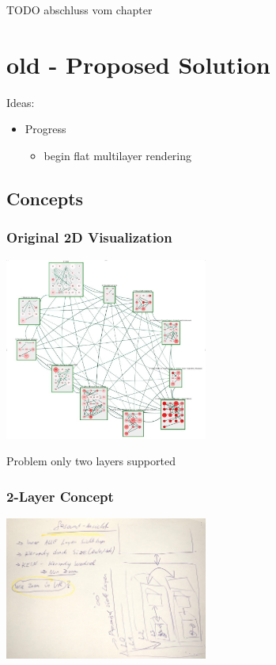 TODO abschluss vom chapter

\chapter{old - Proposed Solution}
Ideas:
\begin{itemize}
    \item Progress
        \begin{itemize}
            \item begin flat multilayer rendering
        \end{itemize}
\end{itemize}

\section{Concepts}
\subsection{Original 2D Visualization}
\includegraphics[width=0.5\textwidth]{chapters/graphics/2dVisOfDemoData.jpg}

Problem only two layers supported

\subsection{2-Layer Concept}
\includegraphics[width=0.5\textwidth]{chapters/graphics/concept2.jpg}


